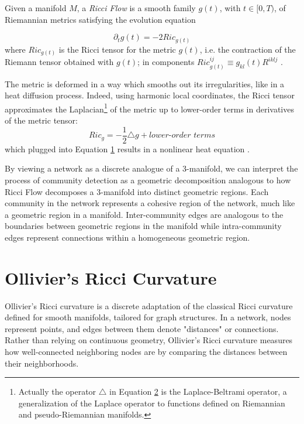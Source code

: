 Given a manifold $M$, a \textit{Ricci Flow} is a smooth family $g(t)$, with $ t \in [0,T)$, of Riemannian metrics satisfying the evolution equation

\begin{equation}\label{eq1}
    \partial_t g(t) = -2 Ric_{g(t)}
\end{equation}
where $Ric_{g(t)}$ is the Ricci tensor for the metric $g(t)$, i.e. the contraction of the Riemann tensor obtained with $g(t)$; in components $Ric_{g(t)}^{ij} \equiv g_{kl}(t)R^{iklj}$ \cite{recentdevelopmentsricciflows}.

The metric is deformed in a way which smooths out its irregularities, like in a heat diffusion process. Indeed, using harmonic local coordinates, the Ricci tensor approximates the Laplacian\footnote{Actually the operator $\triangle$ in Equation \hyperref[eq2]{2} is the Laplace-Beltrami operator, a generalization of the Laplace operator to functions defined on Riemannian and pseudo-Riemannian manifolds.} of the metric up to lower-order terms in derivatives of the metric tensor:
\begin{equation}\label{eq2}
    Ric_{g} = -\frac{1}{2}\triangle g + \textit{lower-order terms}
\end{equation}
which plugged into Equation \hyperref[eq1]{1} results in a nonlinear heat equation \cite{theRicciFlowAnIntroduction}.

By viewing a network as a discrete analogue of a 3-manifold, we can interpret the process of community detection as a geometric decomposition analogous to how Ricci Flow decomposes a 3-manifold into distinct geometric regions. Each community in the network represents a cohesive region of the network, much like a geometric region in a manifold. 
Inter-community edges are analogous to the boundaries between geometric regions in the manifold while intra-community edges represent connections within a homogeneous geometric region.


\section{Ollivier's Ricci Curvature}

Ollivier's Ricci curvature is a discrete adaptation of the classical Ricci curvature defined for smooth manifolds, tailored for graph structures. In a network, nodes represent points, and edges between them denote "distances" or connections. Rather than relying on continuous geometry, Ollivier's Ricci curvature measures how well-connected neighboring nodes are by comparing the distances between their neighborhoods.

